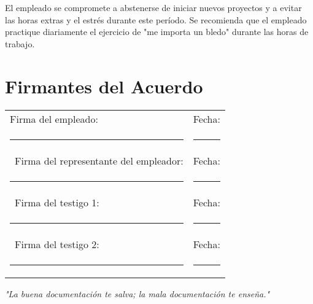 \documentclass[a4paper,11pt]{article}
\begin{document}
El empleado se compromete a abstenerse de iniciar nuevos proyectos y a evitar las horas extras y el estrés durante este período. Se recomienda que el empleado practique diariamente el ejercicio de "me importa un bledo" durante las horas de trabajo.

\section*{Firmantes del Acuerdo}

\vspace{2em}
\noindent\begin{tabular}{@{}p{8cm}p{8cm}@{}}
Firma del empleado: & Fecha: \\
\rule{8cm}{0.4pt} & \rule{8cm}{0.4pt} \\\
Firma del representante del empleador: & Fecha: \\
\rule{8cm}{0.4pt} & \rule{8cm}{0.4pt} \\\
Firma del testigo 1: & Fecha: \\
\rule{8cm}{0.4pt} & \rule{8cm}{0.4pt} \\\
Firma del testigo 2: & Fecha: \\
\rule{8cm}{0.4pt} & \rule{8cm}{0.4pt}
\end{tabular}

\vfill

\begin{center}
    \textit{"La buena documentación te salva; la mala documentación te enseña."}
\end{center}
\end{document}
